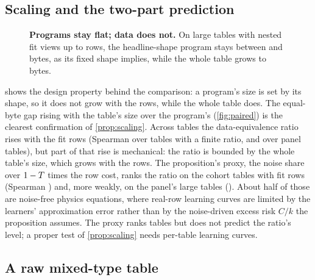 \documentclass{article}
\theoremstyle{remark}
\newlength{\halfwidth}
\newlength{\captionwidth}
\begin{document}
\subsection{Scaling and the two-part prediction}
\label{sec:scaling}

\begin{figure}[t]
  \centering
  \begin{minipage}[c]{\halfwidth}
  \end{minipage}\hfill
  \begin{minipage}[c]{\captionwidth}
    \caption{\textbf{Programs stay flat; data does not.} On \EbScaleDatasets{} large tables with nested fit
    views up to \EbScaleMaxN{} rows, the headline-shape program stays between \EbScaleDopeMin{} and
    \EbScaleDopeMax{} bytes, as its fixed shape implies, while the whole table grows to \EbScaleFullMax{}
    bytes.}
    \label{fig:scaling}
  \end{minipage}
\end{figure}

 shows the design property behind the comparison: a program's size is set by its shape,
so it does not grow with the rows, while the whole table does. The equal-byte gap rising with the table's
size over the program's (\cref{fig:paired}) is the clearest confirmation of \cref{prop:scaling}. Across tables the data-equivalence ratio
rises with the fit rows (Spearman \EbRhoRows{} over \EbRhoRowsN{} tables with a finite ratio, and
\EbPanelRhoRows{} over \EbPanelRhoRowsN{} panel tables), but part of that rise is mechanical: the ratio is
bounded by the whole table's size, which grows with the rows. The proposition's proxy, the noise share over
$1 - T$ times the row cost, ranks the ratio on the \EbRhoProxyN{} cohort tables with \cFitCap{} fit rows
(Spearman \EbRhoProxy{}) and, more weakly, on the panel's \EbPanelRhoProxyN{} large tables
(\EbPanelRhoProxy{}). About half of those are noise-free physics equations, where real-row learning curves are
limited by the learners' approximation error rather than by the noise-driven excess risk $C/k$ the
proposition assumes. The proxy ranks tables but does not predict the ratio's level; a proper test of
\cref{prop:scaling} needs per-table learning curves.

\subsection{A raw mixed-type table}
\end{document}
